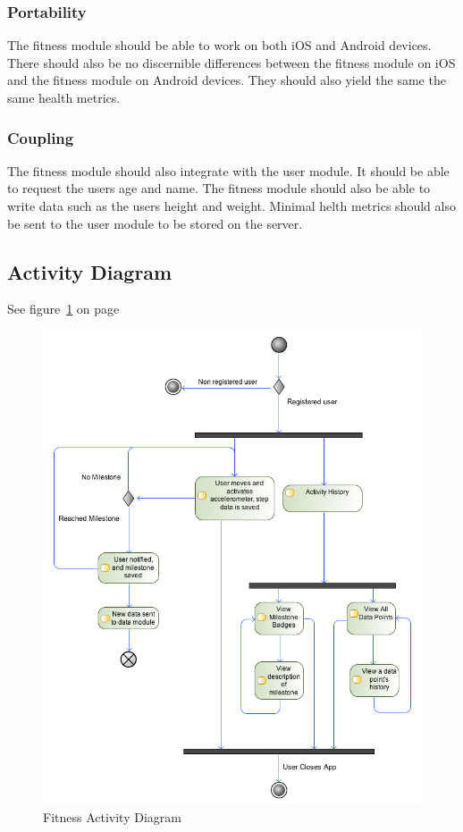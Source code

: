 \subsubsection{Portability} 
The fitness module should be able to work on both iOS and Android devices. There should also be no discernible differences between the fitness module on iOS and the fitness module on Android devices. They should also yield the same the same health metrics. 

\subsubsection{Coupling} 
The fitness module should also integrate with the user module. It should be able to request the users age and name. The fitness module should also be able to write data such as the users height and weight. Minimal helth metrics should also be sent to the user module to be stored on the server. 


\subsection{Activity Diagram}
See figure~\ref{fig:fitness_activity_diagram} on page~\pageref{fig:fitness_activity_diagram}
\begin{figure}
	\centering
	\includegraphics[scale=0.54]{Fitness/fitness_activity_diagram.png}
	\caption{Fitness Activity Diagram}
	\label{fig:fitness_activity_diagram}
\end{figure}

